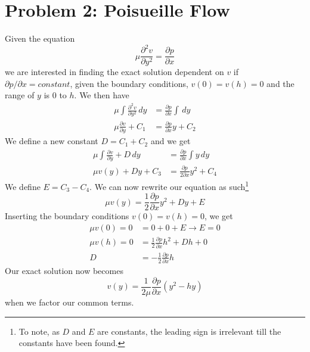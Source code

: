 \documentclass[10pt, a4paper]{amsart}
\begin{document}
\section{Problem 2: Poisueille Flow}
Given the equation 
\begin{equation}\label{eq:ddvddy}
\mu\frac{\partial^2 v}{\partial y^2} = \frac{\partial p}{\partial x}
\end{equation}
we are interested in finding the exact solution dependent on $v$ if $\partial p/\partial x = constant$, given the boundary conditions, $v(0) = v(h) = 0$ and the range of $y$ is $0$ to $h$. 
We then have 
\begin{align}
\mu\int\frac{\partial^2 v}{\partial y^2}\,dy &= \frac{\partial p}{\partial x}\int\,dy \\  
\mu\frac{\partial v}{\partial y} +C_1 &= \frac{\partial p}{\partial x}y + C_2
\end{align}
We define a new constant $D = C_1 + C_2$ and we get 
\begin{align}
\mu\int\frac{\partial v}{\partial y} + D\, dy
 &= \frac{\partial p}{\partial x}\int y\,dy\\
\mu v(y) + Dy+C_3 &= \frac{\partial p}{2\partial	x}y^2 + C_4
\end{align}
We define $E = C_3 - C_4$. We can now rewrite our equation as such\footnote{To note, as $D$ and $E$ are constants, the leading sign is irrelevant till the constants have been found.}
\begin{equation}
\mu v(y) = \frac{1}{2}\frac{\partial p}{\partial x}y^2 + Dy + E
\end{equation} 
Inserting the boundary conditions $v(0) = v(h) = 0$, we get
\begin{align}
\mu v(0) = 0 &= 0 + 0 + E \rightarrow E = 0\\
\mu v(h) = 0 &= \frac{1}{2}\frac{\partial p}{\partial x}h^2 + Dh + 0 \\
D &= -\frac{1}{2}\frac{\partial p}{\partial x}h 
\end{align}
Our exact solution now becomes 
\begin{equation}
v(y) = \frac{1}{2\mu}\frac{\partial p}{\partial x}\left(y^2 - hy\right)
\end{equation}
when we factor our common terms. 
\end{document}
